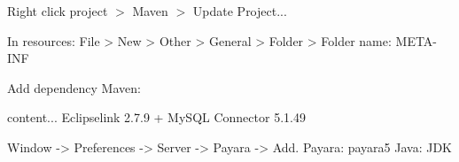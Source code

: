 \documentclass{article}
\begin{document}
	Right click project $>$ Maven $>$ Update Project...
	
	In resources: File > New > Other > General > Folder > Folder name: META-INF
	
	Add dependency Maven:
	\begin{itemize}
		content...
		Eclipselink 2.7.9 + MySQL Connector 5.1.49
	\end{itemize}

	Window -> Preferences -> Server -> Payara -> Add.
	Payara: payara5
	Java: JDK
\end{document}
